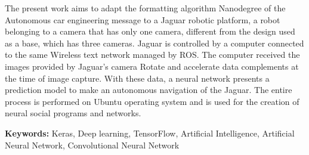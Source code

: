 
The present work aims to adapt the formatting algorithm Nanodegree of the Autonomous car engineering message to a Jaguar robotic platform, a robot belonging to a camera that has only one camera, different from the design used as a base, which has three cameras.
Jaguar is controlled by a computer connected to the same {Wireless} text network managed by ROS. The computer received the images provided by Jaguar's camera Rotate and accelerate data complements at the time of image capture. With these data, a neural network presents a prediction model to make an autonomous navigation of the Jaguar. The entire process is performed on Ubuntu operating system and is used for the creation of neural social programs and networks.

\textbf{Keywords:} {Keras}, {Deep learning}, {TensorFlow}, Artificial Intelligence, Artificial Neural Network, Convolutional Neural Network